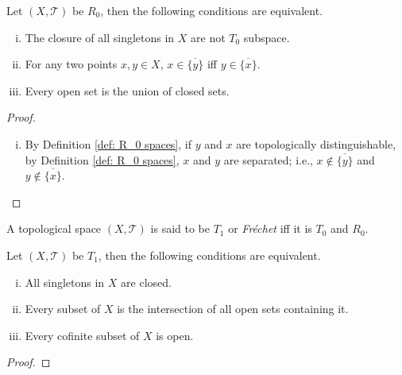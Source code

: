 \begin{proposition}
	\label{prop: alternative definitions of R_0 spaces}
	Let $(X, \mathcal T)$ be $R_0$, then the following conditions are equivalent.
	\begin{enumerate}[(i)]
		\item
		The closure of all singletons in $X$ are not $T_0$ subspace.
		
		\item
		For any two points $x,y \in X$, $x \in \overline{ \{y\} }$ iff $y \in \overline{ \{x\} }$.
		
		\item
		Every open set is the union of closed sets.
	\end{enumerate}
	
	\begin{proof}
		\
		\begin{enumerate}[(i)]
			\item
			By Definition \ref{def: R_0 spaces}, if $y$ and $x$ are topologically distinguishable, by Definition \ref{def: R_0 spaces}, $x$ and $y$ are separated; i.e., $x \notin \overline {\{y\}}$ and $y \notin \overline{\{x\}}$.
		\end{enumerate}
	\end{proof}
\end{proposition}



\begin{definition}
	[$T_1$ spaces]
	\label{def: T_1 spaces}
	A topological space $(X, \mathcal T)$ is said to be $T_1$ or \textit{Fr\'echet} iff it is $T_0$ and $R_0$.
\end{definition}


\begin{proposition}
	\label{prop: alternative definitions of T_1 spaces}
	Let $(X, \mathcal T)$ be $T_1$, then the following conditions are equivalent.
	\begin{enumerate}[(i)]
		\item All singletons in $X$ are closed.
		\item Every subset of $X$ is the intersection of all open sets containing it.
		\item Every cofinite subset of $X$ is open.
	\end{enumerate}
	
	\begin{proof}
		
	\end{proof}
\end{proposition}


